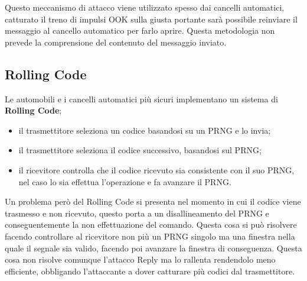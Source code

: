 Questo meccanismo di attacco viene utilizzato spesso dai cancelli automatici, catturato il treno di impulsi OOK sulla giusta portante sarà possibile reinviare il messaggio al cancello automatico per farlo aprire. Questa metodologia non prevede la comprensione del contenuto del messaggio inviato.

\subsection{Rolling Code}
Le automobili e i cancelli automatici più sicuri implementano un sistema di \textbf{Rolling Code};
\begin{itemize}
    \item il trasmettitore seleziona un codice basandosi su un PRNG e lo invia;
    \item il trasmettitore seleziona il codice successivo, basandosi sul PRNG;
    \item il ricevitore controlla che il codice ricevuto sia consistente con il suo PRNG, nel caso lo sia effettua l'operazione e fa avanzare il PRNG.
\end{itemize}
Un problema però del Rolling Code si presenta nel momento in cui il codice viene trasmesso e non ricevuto, questo porta a un disallineamento del PRNG e conseguentemente la non effettuazione del comando. Questa cosa si può risolvere facendo controllare al ricevitore non più un PRNG singolo ma una finestra nella quale il segnale sia valido, facendo poi avanzare la finestra di conseguenza. Questa cosa non risolve comunque l'attacco Reply ma lo rallenta rendendolo meno efficiente, obbligando l'attaccante a dover catturare più codici dal trasmettitore.

